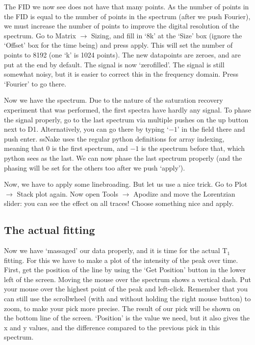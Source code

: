 \documentclass[11pt,a4paper]{article}
\begin{document}
The FID we now see does not have that many points. As the number of points in the FID is equal to the number of points in the spectrum (after we push Fourier), we must increase the number of points to improve the digital resolution of the spectrum. Go to Matrix $\rightarrow$ Sizing, and fill in `8k' at the `Size' box (ignore the `Offset' box for the time being) and press apply. This will set the number of points to 8192 (one `k' is 1024 points). The new datapoints are zeroes, and are put at the end by default. The signal is now `zerofilled'. The signal is still somewhat noisy, but it is easier to correct this in the frequency domain. Press `Fourier' to go there.

Now we have the spectrum. Due to the nature of the saturation recovery experiment that was performed, the first spectra have hardly any signal. To phase the signal properly, go to the last spectrum via multiple pushes on the up button next to D1. Alternatively, you can go there by typing `$-1$' in the field there and push enter. ssNake uses the regular python definitions for array indexing, meaning that 0 is the first spectrum, and $-1$ is the spectrum before that, which python sees as the last. We can now phase the last spectrum properly (and the phasing will be set for the others too after we push `apply').

Now, we have to apply some linebroading. But let us use a nice trick. Go to Plot $\rightarrow$ Stack plot again. Now open Tools $\rightarrow$ Apodize and move the Lorentzian slider: you can see the effect on all traces! Choose something nice and apply. 

\subsection{The actual fitting}
Now we have `massaged' our data properly, and it is time for the actual T$_1$ fitting. For this we have to make a plot of the intensity of the peak over time. First, get the position of the line
by using the `Get Position' button in the lower left of the screen. Moving the mouse over the spectrum shows a vertical dash. Put your mouse over the highest point of the peak and left-click. Remember that you can still use the scrollwheel (with and without holding the right mouse button) to zoom, to make your pick more precise. The result of our pick will be shown on the bottom line of the screen. `Position' is the value we need, but it also gives the x and y values, and the difference compared to the previous pick in this spectrum.
\end{document}
